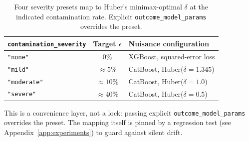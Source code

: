 \begin{table}[!t]
\centering
\small
\begin{tabular}{lcl}
\toprule
\texttt{contamination\_severity} & Target $\epsilon$ & Nuisance configuration \\
\midrule
\texttt{"none"}     & 0\%           & XGBoost, squared-error loss \\
\texttt{"mild"}     & $\approx 5\%$ & CatBoost, Huber($\delta = 1.345$) \\
\texttt{"moderate"} & $\approx 10\%$ & CatBoost, Huber($\delta = 1.0$) \\
\texttt{"severe"}   & $\approx 40\%$ & CatBoost, Huber($\delta = 0.5$) \\
\bottomrule
\end{tabular}
\caption{Four severity presets map to Huber's minimax-optimal $\delta$
at the indicated contamination rate. Explicit
\texttt{outcome\_model\_params} overrides the preset.}
\label{tab:severity}
\end{table}

This is a convenience layer, not a lock: passing explicit
\texttt{outcome\_model\_params} overrides the preset. The mapping
itself is pinned by a regression test (see
Appendix~\ref{app:experiments}) to guard against silent drift.

